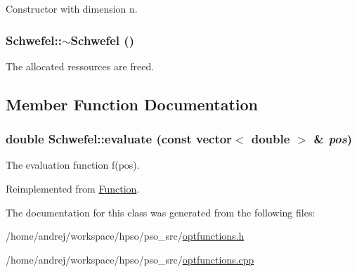 Constructor with dimension n. 

\hypertarget{classSchwefel_1e98da63d923ae569891af1381a390f1}{
\subsubsection{\setlength{\rightskip}{0pt plus 5cm}Schwefel::$\sim$Schwefel ()}}
\label{classSchwefel_1e98da63d923ae569891af1381a390f1}


The allocated ressources are freed. 



\subsection{Member Function Documentation}
\hypertarget{classSchwefel_127479ba86b2a029c9f6811cf21faff2}{
\subsubsection{\setlength{\rightskip}{0pt plus 5cm}double Schwefel::evaluate (const vector$<$ double $>$ \& {\em pos})}}
\label{classSchwefel_127479ba86b2a029c9f6811cf21faff2}


The evaluation function f(pos). 



Reimplemented from \hyperlink{classFunction_159260a1fc3afa8932491e4057b6b844}{Function}.

The documentation for this class was generated from the following files:\begin{CompactItemize}
\item 
/home/andrej/workspace/hpso/pso\_\-src/\hyperlink{optfunctions_8h}{optfunctions.h}\item 
/home/andrej/workspace/hpso/pso\_\-src/\hyperlink{optfunctions_8cpp}{optfunctions.cpp}\end{CompactItemize}
